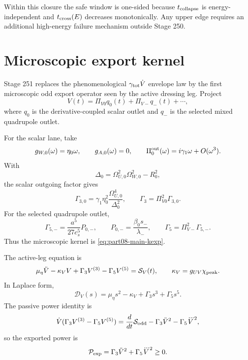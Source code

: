 Within this closure the safe window is one-sided because \(t_{\rm collapse}\) is energy-independent and \(t_{\rm cross}(E)\) decreases monotonically.  Any upper edge requires an additional high-energy failure mechanism outside Stage 250.

\section{Microscopic export kernel}
\label{sec:part08_relaxed_branch:microscopic-export-kernel}

Stage 251 replaces the phenomenological \(\gamma_{\rm tot}\dot V\) envelope law by the first microscopic odd export operator seen by the active dressing leg.  Project
\begin{equation}
\label{eq:part08-stage251-v-projection}
V(t)=\Pi_{V0}q_0(t)+\Pi_{V-}q_-(t)+\cdots,
\end{equation}
where \(q_0\) is the derivative-coupled scalar outlet and \(q_-\) is the selected mixed quadrupole outlet.

For the scalar lane, take
\begin{equation}
\label{eq:part08-stage251-scalar-coupling}
g_{W,0}(\omega)=\eta_0\omega,
\qquad
g_{A,0}(\omega)=0,
\qquad
\Pi_0^{\rm out}(\omega)=i\gamma_1\omega+O(\omega^3).
\end{equation}
With
\begin{equation}
\label{eq:part08-stage251-delta0}
\Delta_0=\Omega_{U,0}^2\Omega_{W,0}^2-R_0^2,
\end{equation}
the scalar outgoing factor gives
\begin{equation}
\label{eq:part08-stage251-gamma30}
\Gamma_{3,0}=\gamma_1\eta_0^2\frac{\Omega_{U,0}^4}{\Delta_0^2},
\qquad
\Gamma_3=\Pi_{V0}^{2}\Gamma_{3,0}.
\end{equation}
For the selected quadrupole outlet,
\begin{equation}
\label{eq:part08-stage251-gamma5}
\Gamma_{5,-}=\frac{a^5}{27c_s^5}P_{0,-},
\qquad
P_{0,-}=\frac{\beta_0s_-}{\lambda_-},
\qquad
\Gamma_5=\Pi_{V-}^{2}\Gamma_{5,-}.
\end{equation}
Thus the microscopic kernel is \cref{eq:part08-main-kexp}.

The active-leg equation is
\begin{equation}
\label{eq:part08-stage251-active-equation}
\mu_\eta\ddot V-\kappa_VV+
\Gamma_3V^{(3)}-
\Gamma_5V^{(5)}=
\mathcal S_V(t),
\qquad
\kappa_V=g_{UV}\chi_{\rm peak}.
\end{equation}
In Laplace form,
\begin{equation}
\label{eq:part08-stage251-laplace-d}
\mathcal D_V(s)=\mu_\eta s^2-\kappa_V+\Gamma_3s^3+\Gamma_5s^5.
\end{equation}
The passive power identity is
\begin{equation}
\label{eq:part08-stage251-power-identity}
\dot V(\Gamma_3V^{(3)}-\Gamma_5V^{(5)})
=
\frac{d}{dt}\mathcal S_{\rm odd}
-
\Gamma_3\ddot V^{2}
-
\Gamma_5\dddot V^{2},
\end{equation}
so the exported power is
\begin{equation}
\label{eq:part08-stage251-export-power}
\mathcal P_{\rm exp}=\Gamma_3\ddot V^{2}+\Gamma_5\dddot V^{2}\ge0.
\end{equation}


